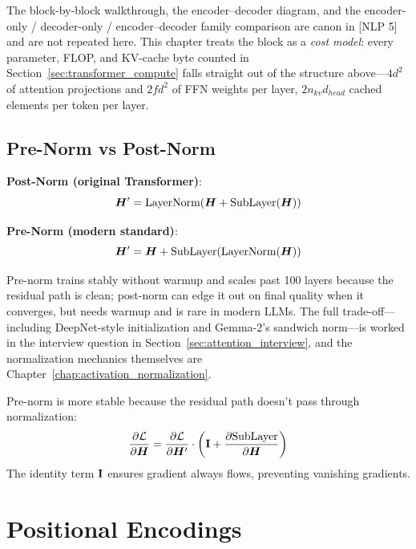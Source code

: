 The block-by-block walkthrough, the encoder--decoder diagram, and the encoder-only / decoder-only / encoder--decoder family comparison are canon in [NLP 5] and are not repeated here. This chapter treats the block as a \textit{cost model}: every parameter, FLOP, and KV-cache byte counted in Section~\ref{sec:transformer_compute} falls straight out of the structure above---$4d^2$ of attention projections and $2fd^2$ of FFN weights per layer, $2 n_{kv} d_{head}$ cached elements per token per layer.
\label{fig:transformer_block}

\subsection{Pre-Norm vs Post-Norm}

\textbf{Post-Norm (original Transformer)}:
\begin{equation}
\bm{H}' = \text{LayerNorm}(\bm{H} + \text{SubLayer}(\bm{H}))
\end{equation}

\textbf{Pre-Norm (modern standard)}:
\begin{equation}
\bm{H}' = \bm{H} + \text{SubLayer}(\text{LayerNorm}(\bm{H}))
\end{equation}

Pre-norm trains stably without warmup and scales past 100 layers because the residual path is clean; post-norm can edge it out on final quality when it converges, but needs warmup and is rare in modern LLMs. The full trade-off---including DeepNet-style initialization and Gemma-2's sandwich norm---is worked in the interview question in Section~\ref{sec:attention_interview}, and the normalization mechanics themselves are Chapter~\ref{chap:activation_normalization}.

\begin{keyinsight}
Pre-norm is more stable because the residual path doesn't pass through normalization:
\begin{equation}
\frac{\partial \mathcal{L}}{\partial \bm{H}} = \frac{\partial \mathcal{L}}{\partial \bm{H}'} \cdot \left(\mathbf{I} + \frac{\partial \text{SubLayer}}{\partial \bm{H}}\right)
\end{equation}
The identity term $\mathbf{I}$ ensures gradient always flows, preventing vanishing gradients.
\end{keyinsight}

\section{Positional Encodings}
\label{sec:positional}


